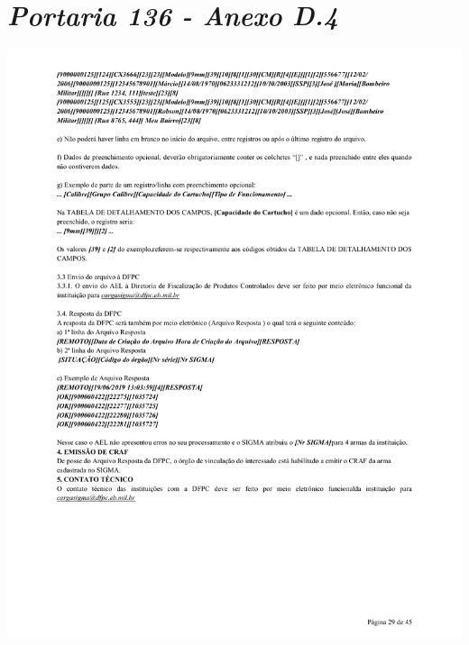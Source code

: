 \chapter{\textit{Portaria 136 - Anexo D.4}}\label{sec:anexoA4}
\includegraphics[scale=0.8]{imagens/AnexoA4-AnexoD-portaria-136}

